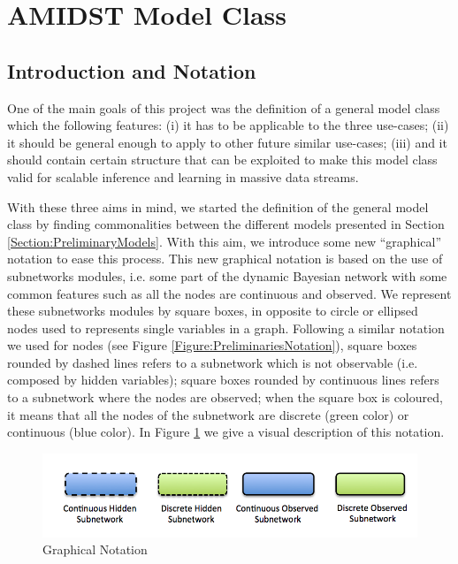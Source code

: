 \section{AMIDST Model Class}

\subsection{Introduction  and Notation}

One of the main goals of this project was the definition of a general model class which the following features: (i) it has to be applicable to the three use-cases; (ii) it should be general enough to apply to other future similar use-cases;  (iii) and it should contain certain structure that can be exploited to make this model class valid for scalable inference and learning in massive data streams. 

With these three aims in mind,  we started the definition of the general model class by finding commonalities between the different models presented in Section \ref{Section:PreliminaryModels}.  With this aim, we  introduce some new ``graphical'' notation to ease this process. This new graphical notation is based on the use of subnetworks modules, i.e. some part of the dynamic Bayesian network with some common features such as all the nodes are continuous and observed.  We represent these subnetworks modules by square boxes, in opposite to circle or ellipsed nodes used to represents single variables in a graph. Following a similar notation we used for nodes (see Figure \ref{Figure:PreliminariesNotation}), square boxes rounded by dashed lines refers to a subnetwork which is not observable (i.e. composed by hidden variables); square boxes rounded by continuous lines refers to a subnetwork where the nodes are observed; when the square box is coloured, it means that all the nodes of the subnetwork are discrete (green color) or continuous (blue color). In Figure \ref{Figure:ModelClass:Notation} we give a visual description of this notation. 


\begin{figure}
\begin{center}
\includegraphics[scale=0.4]{./figures/ModelClass0}
\caption{\label{Figure:ModelClass:Notation} Graphical Notation}
\end{center}
\end{figure}

